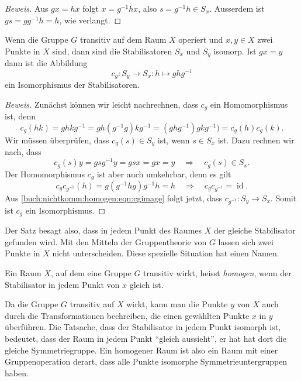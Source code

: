 \begin{proof}[Beweis]
Aus $gx=hx$ folgt $x=g^{-1}hx$, also $s=g^{-1}h\in S_x$.
Ausserdem ist $gs=gg^{-1}h=h$, wie verlangt.
\end{proof}

\begin{satz}
Wenn die Gruppe $G$ transitiv auf dem Raum $X$ operiert und $x,y\in X$
zwei Punkte in $X$ sind, dann sind die Stabilisatoren $S_x$ und $S_y$
isomorp.
Ist $gx=y$ dann ist die Abbildung
\[
c_g\colon
S_y\to S_x: h\mapsto ghg^{-1}
\]
ein Isomorphismus der Stabilisatoren.
\end{satz}

\begin{proof}[Beweis]
Zunächst können wir leicht nachrechnen, dass $c_g$ ein Homomorphismus ist,
denn
\[
c_g(hk)
=
ghkg^{-1}
=
gh(g^{-1}g)kg^{-1}
=
(ghg^{-1})gkg^{-1})
=
c_g(h)c_g(k).
\]
Wir müssen überprüfen, dass $c_g(s)\in S_y$ ist, wenn $s\in S_x$ ist.
Dazu rechnen wir nach, dass
\begin{equation}
c_g(s)y = gsg^{-1} y = gsx=gx=y
\quad\Rightarrow\quad
c_g(s)\in S_x.
\label{buch:nichtkomm:homogen:eqn:cgimage}
\end{equation}
Der Homomorphismus $c_g$ ist aber auch umkehrbar, denn es gilt
\[
c_gc_{g^{-1}}(h)
=
g(g^{-1}hg)g^{-1}h
=
h
\quad\Rightarrow\quad
c_gc_{g^{-1}}=\operatorname{id}.
\]
Aus \eqref{buch:nichtkomm:homogen:eqn:cgimage} folgt jetzt, dass
$c_{g^{-1}}\colon S_y\to S_x$.
Somit ist $c_g$ ein Isomorphismus.
\end{proof}

Der Satz besagt also, dass in jedem Punkt des Raumes $X$ der gleiche
Stabilisator gefunden wird.
Mit den  Mitteln der Gruppentheorie von $G$ lassen sich zwei Punkte 
in $X$ nicht unterscheiden.
Diese spezielle Situation hat einen Namen.

\begin{definition}
Ein Raum $X$, auf dem eine Gruppe $G$ transitiv wirkt, heisst
{\em homogen}, wenn der Stabilisator in jedem Punkt von $x$ gleich ist.
%
\end{definition}

Da die Gruppe $G$ transitiv auf $X$ wirkt, kann man die Punkte $y$ von 
$X$ auch durch die Transformationen bechreiben, die einen gewählten
Punkte $x$ in $y$ überführen.
Die Tatsache, dass der Stabilisator in jedem Punkt isomorph ist, 
bedeutet, dass der Raum in jedem Punkt ``gleich aussieht'', er hat
hat dort die gleiche Symmetriegruppe.
Ein homogener Raum ist also ein Raum mit einer Gruppenoperation derart,
dass alle Punkte isomorphe Symmetrieuntergruppen haben.

